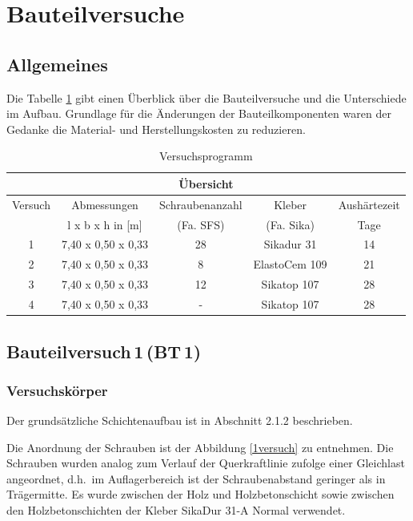 
\section{Bauteilversuche}

\subsection{Allgemeines}

Die Tabelle \ref{tab:Versuchsprogramm} gibt einen Überblick über die Bauteilversuche  und die Unterschiede im Aufbau. Grundlage für die Änderungen der Bauteilkomponenten waren der Gedanke die Material- und Herstellungskosten zu reduzieren. 

\begin{table}[h]
\caption{Versuchsprogramm}
\begin{center}
\begin{tabular}{|c|c|c|c|c|}
\hline 
\multicolumn{5}{|c|}{ Übersicht} \\ 
\hline 
Versuch & Abmessungen  & Schraubenanzahl & Kleber & Aushärtezeit \\ 

&  l x b x h in [m] & (Fa. SFS) & (Fa. Sika)   & Tage \\ 
\hline\hline
1 & 7,40 x 0,50 x 0,33 & 28 & Sikadur 31   & 14 \\ 
\hline 
2  & 7,40 x 0,50 x 0,33 & 8 & ElastoCem 109  & 21 \\ 
\hline 
3 & 7,40 x 0,50 x 0,33 & 12 & Sikatop 107  & 28 \\ 
\hline 
4  & 7,40 x 0,50 x 0,33 & - & Sikatop 107  & 28 \\ 
\hline 
\end{tabular} 
\end{center}
\label{tab:Versuchsprogramm}
\end{table}

\subsection{Bauteilversuch\,1\,(BT\,1)}

\subsubsection{Versuchskörper}

Der grundsätzliche Schichtenaufbau ist in Abschnitt 2.1.2 beschrieben. 

 Die Anordnung der Schrauben ist der Abbildung \ref{1versuch} zu entnehmen. Die Schrauben wurden analog zum Verlauf der Querkraftlinie zufolge einer Gleichlast angeordnet, d.h.\ im Auflagerbereich ist der Schraubenabstand geringer als in Trägermitte. Es wurde zwischen der Holz und Holzbetonschicht sowie zwischen den Holzbetonschichten der Kleber SikaDur 31-A Normal verwendet. 
 
